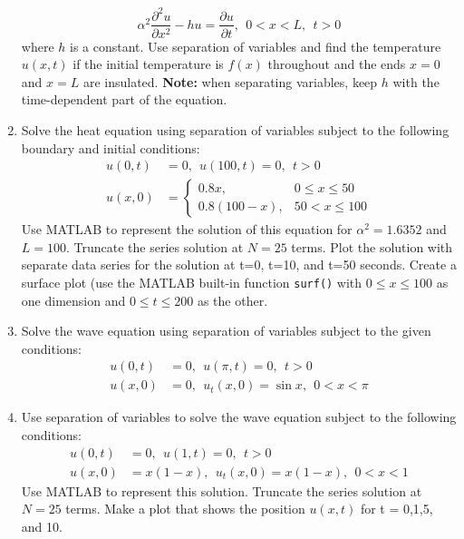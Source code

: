 \begin{fullwidth}
\begin{enumerate}
\begin{equation*}
\alpha^2 \frac{\partial^2 u}{\partial x^2} - hu = \frac{\partial u}{\partial t}, \ \ 0<x<L, \ \ t>0
\end{equation*}
where $h$ is a constant.  Use separation of variables and find the temperature $u(x,t)$ if the initial temperature is $f(x)$ throughout and the ends $x=0$ and $x=L$ are insulated. \textbf{Note:} when separating variables, keep $h$ with the time-dependent part of the equation.


\vspace{2.0cm}

\item Solve the heat equation using separation of variables subject to the following boundary and initial conditions:
\begin{align*}
u(0,t) &= 0, \ \ u(100,t) = 0, \ \ t>0 \\
u(x,0) &= 
\begin{cases}
0.8x, & 0 \le x \le 50 \\
0.8(100-x), & 50 < x \le 100
\end{cases}
\end{align*}
Use MATLAB to represent the solution of this equation for $\alpha^2 = 1.6352$ and $L=100$.  Truncate the series solution at $N=25$ terms.  Plot the solution with separate data series for the solution at t=0, t=10, and t=50 seconds.  Create a surface plot (use the MATLAB built-in function \lstinline[style=myMatlab]{surf()} with $0 \le x \le 100$ as one dimension and $0 \le t \le 200$ as the other.

\vspace{2.0cm}

\item Solve the wave equation using separation of variables subject to the given conditions:
\begin{align*}
u(0,t) &= 0, \ \ u(\pi,t)=0, \ \ t>0 \\
u(x,0) &=0, \ \ u_{t}(x,0) = \sin{x}, \ \ 0 < x < \pi
\end{align*}

\vspace{2.0cm}

\item Use separation of variables to solve the wave equation subject to the following conditions:
\begin{align*}
u(0,t) &= 0, \ \ u(1,t)=0, \ \ t>0 \\
u(x,0) &=x(1-x), \ \ u_{t}(x,0) = x(1-x), \ \ 0 < x < 1
\end{align*}
Use MATLAB to represent this solution.  Truncate the series solution at $N=25$ terms.  Make a plot that shows the position $u(x,t)$ for t = 0,1,5, and 10.
\end{enumerate}


\end{fullwidth}
